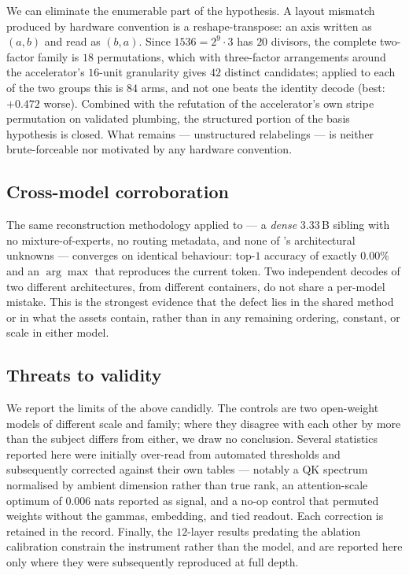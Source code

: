 We can eliminate the enumerable part of the hypothesis. A layout mismatch produced by hardware
convention is a reshape-transpose: an axis written as $(a,b)$ and read as $(b,a)$. Since
$1536 = 2^9\cdot 3$ has $20$ divisors, the complete two-factor family is $18$ permutations, which
with three-factor arrangements around the accelerator's $16$-unit granularity gives $42$ distinct
candidates; applied to each of the two groups this is $84$ arms, and not one beats the identity
decode (best: $+0.472$ worse). Combined with the refutation of the accelerator's own stripe
permutation on validated plumbing, the structured portion of the basis hypothesis is closed. What
remains --- unstructured relabelings --- is neither brute-forceable nor motivated by any hardware
convention.

\subsection{Cross-model corroboration}

The same reconstruction methodology applied to  --- a \emph{dense}
$3.33$\,B sibling with no mixture-of-experts, no routing metadata, and none of 's
architectural unknowns --- converges on identical behaviour: top-$1$ accuracy of exactly $0.00\%$
and an $\arg\max$ that reproduces the current token. Two independent decodes of two different
architectures, from different containers, do not share a per-model mistake. This is the strongest
evidence that the defect lies in the shared method or in what the assets contain, rather than in
any remaining ordering, constant, or scale in either model.

\subsection{Threats to validity}

We report the limits of the above candidly. The controls are two open-weight models of different
scale and family; where they disagree with each other by more than the subject differs from
either, we draw no conclusion. Several statistics reported here were initially over-read from
automated thresholds and subsequently corrected against their own tables --- notably a QK spectrum
normalised by ambient dimension rather than true rank, an attention-scale optimum of $0.006$ nats
reported as signal, and a no-op control that permuted weights without the gammas, embedding, and
tied readout. Each correction is retained in the record. Finally, the $12$-layer results predating
the ablation calibration constrain the instrument rather than the model, and are reported here
only where they were subsequently reproduced at full depth.

